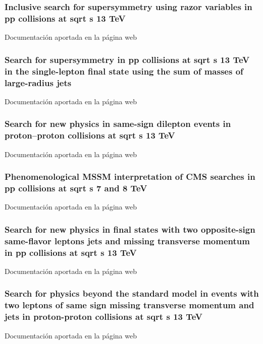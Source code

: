 \documentclass[a4paper, 11pt, twoside, openright]{report}
\begin{document}
\subsubsection{Inclusive search for supersymmetry using razor variables in pp collisions at  sqrt s 13 TeV}
Documentación aportada en la página web
%
\subsubsection{Search for supersymmetry in pp collisions at sqrt s 13 TeV in the single-lepton final state using the sum of masses of large-radius jets}
Documentación aportada en la página web
%
\subsubsection{Search for new physics in same-sign dilepton events in proton–proton collisions at sqrt s 13 TeV}
Documentación aportada en la página web
%
\subsubsection{Phenomenological MSSM interpretation of CMS searches in pp collisions at sqrt s 7 and 8 TeV}
Documentación aportada en la página web
%
\subsubsection{Search for new physics in final states with two opposite-sign same-flavor leptons jets and missing transverse momentum in pp collisions at sqrt s 13 TeV}
Documentación aportada en la página web
%
\subsubsection{Search for physics beyond the standard model in events with two leptons of same sign missing transverse momentum and jets in proton-proton collisions at sqrt s 13 TeV}
Documentación aportada en la página web
%
\end{document}
